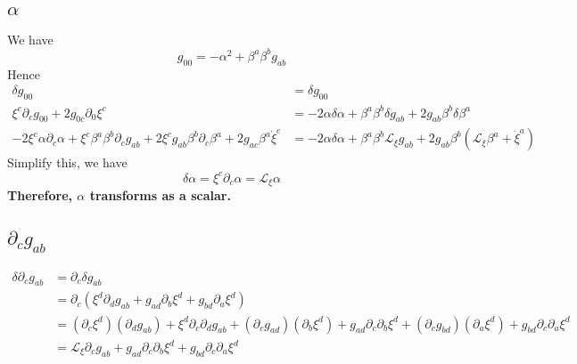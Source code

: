 \documentclass{article}
\begin{document}
\subsection{$\alpha$}
We have
\[
g_{00} = -\alpha^2 + \beta^{a}\beta^{b}g_{ab}
\]
Hence
\begin{align*}
\delta g_{00} & = \delta g_{00}\\
\xi^{c}\partial_{c}g_{00} + 2g_{0c}\partial_{0}\xi^{c} & = -2\alpha\delta\alpha + \beta^{a}\beta^{b}\delta g_{ab} + 2g_{ab}\beta^{b} \delta \beta^{a}\\
-2\xi^{c}\alpha \partial_{c}\alpha + \xi^{c} \beta^{a}\beta^{b}\partial_{c}g_{ab} + 2\xi^{c}g_{ab}\beta^{b} \partial_{c}\beta^{a} + 2g_{ac}\beta^{a}{\dot \xi}^{c} & = -2\alpha\delta \alpha + \beta^{a}\beta^{b}\mathcal{L}_{\xi}g_{ab} + 2g_{ab}\beta^{b}(\mathcal{L}_{\xi}\beta^{a} + {\dot \xi}^{a})
\end{align*}
Simplify this, we have
\[
\boxed{
\delta \alpha = \xi^{c}\partial_{c}\alpha = \mathcal{L}_{\xi}\alpha
}
\]
{\bf {\color{red}Therefore, $\alpha$ transforms as a scalar.}}
\subsection{$\partial_{c}g_{ab}$}
\begin{align*}
\delta \partial_{c}g_{ab} & = \partial_{c}\delta g_{ab}\\
& = \partial_{c} (\xi^{d}\partial_{d}g_{ab} + g_{ad}\partial_{b}\xi^{d} + g_{bd}\partial_{a}\xi^{d})\\
& = (\partial_{c}\xi^{d})(\partial_{d}g_{ab}) + \xi^{d}\partial_{c}\partial_{d}g_{ab} + (\partial_{c}g_{ad})(\partial_{b}\xi^{d}) + g_{ad}\partial_{c}\partial_{b}\xi^{d} +  (\partial_{c}g_{bd})(\partial_{a}\xi^{d}) + g_{bd}\partial_{c}\partial_{a}\xi^{d}\\
& = \mathcal{L}_{\xi}\partial_{c}g_{ab} + g_{ad}\partial_{c}\partial_{b}\xi^{d} + g_{bd}\partial_{c}\partial_{a}\xi^{d}
\end{align*}
\end{document}

